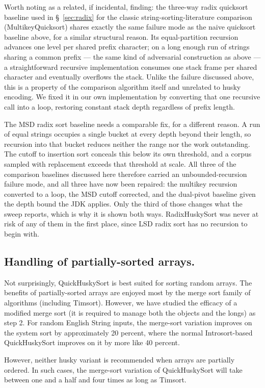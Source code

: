 \documentclass[twoside,leqno,twocolumn]{article}
\begin{document}
Worth noting as a related, if incidental, finding:
the three-way radix quicksort baseline used in \S~\ref{sec:radix} for the classic string-sorting-literature comparison (MultikeyQuicksort)
shares exactly the same failure mode as the naive quicksort baseline above, for a similar structural reason.
Its equal-partition recursion advances one level per shared prefix character;
on a long enough run of strings sharing a common prefix — the same kind of adversarial construction as above —
a straightforward recursive implementation consumes one stack frame per shared character and eventually overflows the stack.
Unlike the failure discussed above, this is a property of the comparison algorithm itself and unrelated to husky encoding.
We fixed it in our own implementation by converting that one recursive call into a loop,
restoring constant stack depth regardless of prefix length.

The MSD radix sort baseline needs a comparable fix, for a different reason.
A run of equal strings occupies a single bucket at every depth beyond their length,
so recursion into that bucket reduces neither the range nor the work outstanding.
The cutoff to insertion sort conceals this below its own threshold,
and a corpus sampled with replacement exceeds that threshold at scale.
All three of the comparison baselines discussed here therefore carried an unbounded-recursion failure mode,
and all three have now been repaired: the multikey recursion converted to a loop, the MSD cutoff corrected,
and the dual-pivot baseline given the depth bound the JDK applies.
Only the third of those changes what the sweep reports, which is why it is shown both ways.
RadixHuskySort was never at risk of any of them in the first place,
since LSD radix sort has no recursion to begin with.

\subsection{Handling of partially-sorted arrays.}

Not surprisingly, QuickHuskySort is best suited for sorting random arrays.
The benefits of partially-sorted arrays are enjoyed most by the merge sort family of algorithms (including Timsort).
However, we have studied the efficacy of a modified merge sort (it is required to manage both the objects and the longs) as step 2.
For random English String inputs,
the merge-sort variation improves on the system sort by approximately 20 percent, where the normal Introsort-based QuickHuskySort improves on it by more like 40 percent.

However, neither husky variant is recommended when arrays are partially ordered.
In such cases, the merge-sort variation of QuickHuskySort will take between one and a half and four times as long as Timsort.
\end{document}
